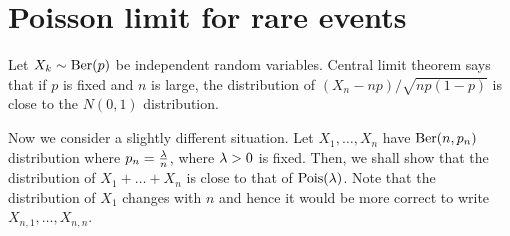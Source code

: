 \documentclass[preprint,  11pt]{amsart}
\begin{document}


\newpage
\section{Poisson limit for rare events}
Let $X_{k}\sim \mbox{Ber}(p)$ be independent random variables. Central limit theorem says that if $p$ is fixed and $n$ is large, the distribution of $(X_{n}-np)/\sqrt{np(1-p)}$ is close to the  $N(0,1)$ distribution.

Now we consider a slightly different situation. Let $X_{1},\ldots ,X_{n}$ have $\mbox{Ber}(n,p_{n})$ distribution where $p_{n}=\frac{\lambda}{n}$, where $\lambda>0$ is fixed. Then, we shall show that the distribution of $X_{1}+\ldots +X_{n}$ is close to that of $\mbox{Pois}(\lambda)$. Note that the distribution of $X_{1}$ changes with $n$ and hence it would be more correct to write $X_{n,1}, \ldots ,X_{n,n}$.
\end{document}
